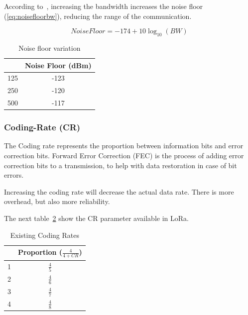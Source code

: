 According to~\cite{semtech:modulationbasics}, increasing the
bandwidth increases the noise floor (\ref{eq:noisefloorbw}), reducing the
range of the communication.

\begin{equation}
 \label{eq:noisefloorbw} 
  Noise Floor = -174 + 10 \log_{10}(BW)
\end{equation}


\begin{table}[h!]
\centering
\begin{tabular}{|c|c|}
\hline
\rowcolor[HTML]{C0C0C0} 
\multicolumn{1}{|c|}{\cellcolor[HTML]{C0C0C0}Bandwidth(kHz)} & Noise Floor (dBm) \\ \hline
125                                                          & -123              \\ \hline
250                                                          & -120              \\ \hline
500                                                          & -117              \\ \hline
\end{tabular}
\caption{Noise floor variation\label{table:bw}}
\end{table}


\subsubsection{Coding-Rate (CR)}

The Coding rate represents the proportion between information bits and error
correction bits. 
Forward Error Correction (FEC) is the process of adding error correction bits to a
transmission, to help with data restoration in case of bit errors.

Increasing the coding rate will decrease the actual data rate. 
There is more overhead, but also more reliability.

The next table~\ref{table:cr} show the CR parameter available in LoRa.

\begin{table}[h!]
\centering
\begin{tabular}{|c|c|}
\hline
\rowcolor[HTML]{C0C0C0} 
  \multicolumn{1}{|c|}{\cellcolor[HTML]{C0C0C0}CR} & Proportion ($\frac{4}{4 + CR}$) \\ \hline
1                                                & $\frac{4}{5}$\\ \hline
2                                                & $\frac{4}{6}$\\ \hline
3                                                & $\frac{4}{7}$\\ \hline
4                                                & $\frac{4}{8}$\\ \hline
\end{tabular}
  \caption{Existing Coding Rates\label{table:cr}}
\end{table}

